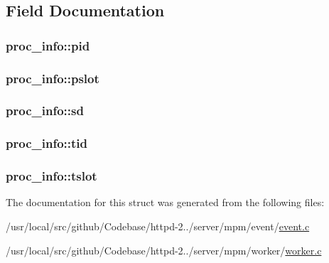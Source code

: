 \subsection{Field Documentation}
\subsubsection[{\texorpdfstring{pid}{pid}}]{ proc\+\_\+info\+::pid}\hypertarget{structproc__info_a50c0df08d65cb6824cf3aa3379af2e63}{}\label{structproc__info_a50c0df08d65cb6824cf3aa3379af2e63}
\subsubsection[{\texorpdfstring{pslot}{pslot}}]{ proc\+\_\+info\+::pslot}\hypertarget{structproc__info_a83750751392fb11f5d959197dcec4361}{}\label{structproc__info_a83750751392fb11f5d959197dcec4361}
\subsubsection[{\texorpdfstring{sd}{sd}}]{ proc\+\_\+info\+::sd}\hypertarget{structproc__info_a264c12ac7361f212570e51c91025b9b5}{}\label{structproc__info_a264c12ac7361f212570e51c91025b9b5}
\subsubsection[{\texorpdfstring{tid}{tid}}]{ proc\+\_\+info\+::tid}\hypertarget{structproc__info_aa1467e93e56d40296f1b036cd72c37d3}{}\label{structproc__info_aa1467e93e56d40296f1b036cd72c37d3}
\subsubsection[{\texorpdfstring{tslot}{tslot}}]{ proc\+\_\+info\+::tslot}\hypertarget{structproc__info_a2093cd5fe4ff4b2a733ba51e651be150}{}\label{structproc__info_a2093cd5fe4ff4b2a733ba51e651be150}


The documentation for this struct was generated from the following files\+:\begin{DoxyCompactItemize}
\item 
/usr/local/src/github/\+Codebase/httpd-\/2../server/mpm/event/\hyperlink{event_8c}{event.\+c}\item 
/usr/local/src/github/\+Codebase/httpd-\/2../server/mpm/worker/\hyperlink{worker_8c}{worker.\+c}\end{DoxyCompactItemize}
